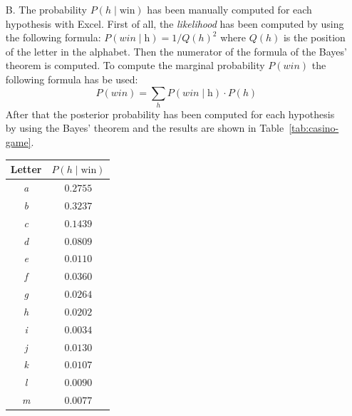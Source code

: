 \begin{itemize}
    \item[B.] The probability $P(h\;|\;\text{win})$ has been manually computed for each hypothesis with Excel. First of all, the
        \textit{likelihood} has been computed by using the following formula: $P(win\;|\;\text{h}) = 1/Q(h)^{2}$ where $Q(h)$ is
        the position of the letter in the alphabet. Then the numerator of the formula of the Bayes' theorem is computed.
        To compute the marginal probability $P(win)$ the following formula has be used:
        \[ P(win) = \sum_{h} P(win\;|\;\text{h}) \cdot P(h)\]
        After that the posterior probability has been computed for each hypothesis by using the Bayes' theorem and the results are shown
        in Table~\ref{tab:casino-game}.
        \begin{table}[H]
            \centering
            \begin{minipage}{.4\linewidth}
                \centering
                \begin{tabular}{c c}
                    \hline
                    \textbf{Letter} & $P(h\;|\;\text{win})$ \\
                    \hline
                    \textit{a} & $0.2755$ \\
                    \textit{b} & $0.3237$ \\
                    \textit{c} & $0.1439$ \\
                    \textit{d} & $0.0809$ \\
                    \textit{e} & $0.0110$ \\
                    \textit{f} & $0.0360$ \\
                    \textit{g} & $0.0264$ \\
                    \textit{h} & $0.0202$ \\
                    \textit{i} & $0.0034$ \\
                    \textit{j} & $0.0130$ \\
                    \textit{k} & $0.0107$ \\
                    \textit{l} & $0.0090$ \\
                    \textit{m} & $0.0077$ \\
                    \hline
                \end{tabular}
            \end{minipage}
            \begin{minipage}{.4\linewidth}
                \centering
                \begin{tabular}{c c}

\end{tabular}
\end{minipage}
\end{table}
\end{itemize}
